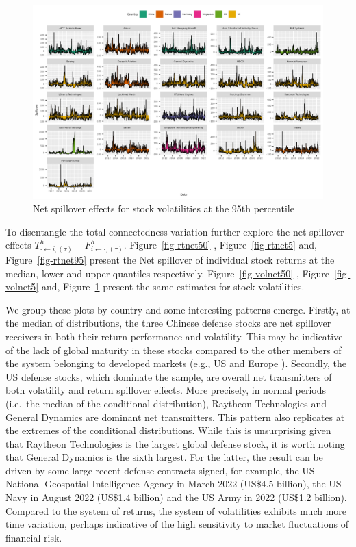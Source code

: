 \documentclass[
  letterpaper,
  DIV=11,
  numbers=noendperiod]{scrartcl}
\begin{document}
\begin{figure}[H]

{\centering \includegraphics{plots/fig-volnet95.png}

}

\caption{\label{fig-volnet95}Net spillover effects for stock
volatilities at the 95th percentile}

\end{figure}

To disentangle the total connectedness variation further explore the net
spillover effects
\(T_{\cdot \leftarrow i,(\tau)}^h -F_{i \leftarrow \cdot,(\tau)}^h\).
Figure~\ref{fig-rtnet50} , Figure~\ref{fig-rtnet5} and,
Figure~\ref{fig-rtnet95} present the Net spillover of individual stock
returns at the median, lower and upper quantiles respectively.
Figure~\ref{fig-volnet50} , Figure~\ref{fig-volnet5} and,
Figure~\ref{fig-volnet95} present the same estimates for stock
volatilities.

We group these plots by country and some interesting patterns emerge.
Firstly, at the median of distributions, the three Chinese defense
stocks are net spillover receivers in both their return performance and
volatility. This may be indicative of the lack of global maturity in
these stocks compared to the other members of the system belonging to
developed markets (e.g., US and Europe ). Secondly, the US defense
stocks, which dominate the sample, are overall net transmitters of both
volatility and return spillover effects. More precisely, in normal
periods (i.e.~the median of the conditional distribution), Raytheon
Technologies and General Dynamics are dominant net transmitters. This
pattern also replicates at the extremes of the conditional
distributions. While this is unsurprising given that Raytheon
Technologies is the largest global defense stock, it is worth noting
that General Dynamics is the sixth largest. For the latter, the result
can be driven by some large recent defense contracts signed, for
example, the US National Geospatial-Intelligence Agency in March 2022
(US\$4.5 billion), the US Navy in August 2022 (US\$1.4 billion) and the
US Army in 2022 (US\$1.2 billion). Compared to the system of returns,
the system of volatilities exhibits much more time variation, perhaps
indicative of the high sensitivity to market fluctuations of financial
risk.
\end{document}
